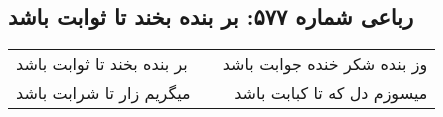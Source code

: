 \begin{center}
\section*{رباعی شماره ۵۷۷: بر بنده بخند تا ثوابت باشد}
\label{sec:0577}
\begin{longtable}{l p{0.5cm} r}
بر بنده بخند تا ثوابت باشد
&&
وز بنده شکر خنده جوابت باشد
\\
میگریم زار تا شرابت باشد
&&
میسوزم دل که تا کبابت باشد
\\
\end{longtable}
\end{center}
